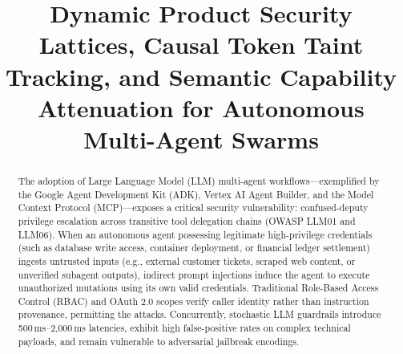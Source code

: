 \documentclass[conference,10pt]{IEEEtran}
\begin{document}
\title{Dynamic Product Security Lattices, Causal Token Taint Tracking, and Semantic Capability Attenuation for Autonomous Multi-Agent Swarms}

\author{
}

\maketitle

\begin{abstract}
The adoption of Large Language Model (LLM) multi-agent workflows---exemplified by the Google Agent Development Kit (ADK), Vertex AI Agent Builder, and the Model Context Protocol (MCP)---exposes a critical security vulnerability: confused-deputy privilege escalation across transitive tool delegation chains (OWASP LLM01 and LLM06). When an autonomous agent possessing legitimate high-privilege credentials (such as database write access, container deployment, or financial ledger settlement) ingests untrusted inputs (e.g., external customer tickets, scraped web content, or unverified subagent outputs), indirect prompt injections induce the agent to execute unauthorized mutations using its own valid credentials. Traditional Role-Based Access Control (RBAC) and OAuth 2.0 scopes verify caller identity rather than instruction provenance, permitting the attacks. Concurrently, stochastic LLM guardrails introduce 500\,ms--2,000\,ms latencies, exhibit high false-positive rates on complex technical payloads, and remain vulnerable to adversarial jailbreak encodings.


\end{abstract}
\end{document}
